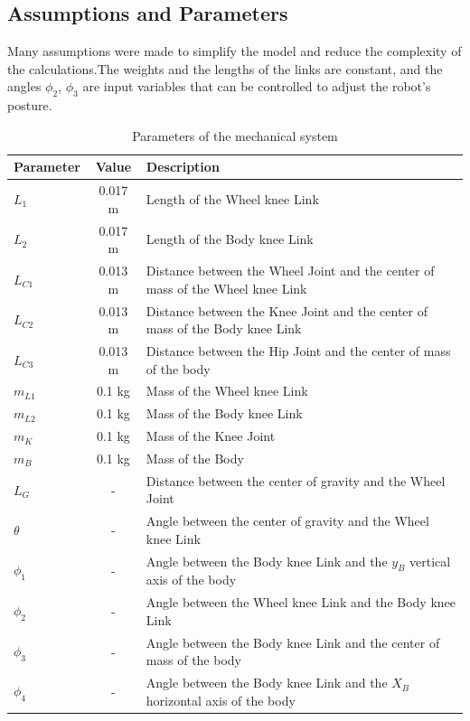 \subsection{Assumptions and Parameters}
Many assumptions were made to simplify the model and reduce the complexity of the calculations.The weights and the lengths of the links are constant, and the angles $\phi_2$, $\phi_3$ are input variables that can be controlled to adjust the robot's posture.
	\begin{table}[h!]
		\centering
		\caption{Parameters of the mechanical system}
		\label{tab:parameters}
		\begin{tabular}{lcl}
			\toprule
			Parameter & Value & Description \\
			\midrule
			$L_1$ & 0.017 m & Length of the Wheel knee Link \\
			$L_2$ & 0.017 m & Length of the Body knee Link \\
			$L_{C1}$ & 0.013 m & Distance between the Wheel Joint and the center of mass of the Wheel knee Link \\
			$L_{C2}$ & 0.013 m & Distance between the Knee Joint and the center of mass of the Body knee Link \\
			$L_{C3}$ & 0.013 m & Distance between the Hip Joint and the center of mass of the body \\
			$m_{L1}$ & 0.1 kg & Mass of the Wheel knee Link \\
			$m_{L2}$ & 0.1 kg & Mass of the Body knee Link \\
			$m_K$ & 0.1 kg & Mass of the Knee Joint \\
			$m_B$ & 0.1 kg & Mass of the Body \\
			$L_G$ & - & Distance between the center of gravity and the Wheel Joint \\
			$\theta$ & - & Angle between the center of gravity and the Wheel knee Link \\
			$\phi_1$ & - & Angle between the Body knee Link and the $y_B$ vertical axis of the body \\
			$\phi_2$ & - & Angle between the Wheel knee Link and the Body knee Link \\
			$\phi_3$ & - & Angle between the Body knee Link and the center of mass of the body \\
			$\phi_4$ & - & Angle between the Body knee Link and the $X_B$ horizontal axis of the body \\
			\bottomrule
		\end{tabular}
	\end{table}


